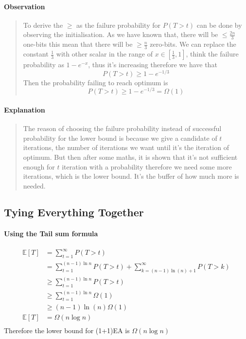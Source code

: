 \documentclass[a4paper, 12pt]{article}
\begin{document}
        \paragraph{Observation}
            \begin{quote}
                To derive the $\geq$ as the failure probability for $P(T > t)$ can be done by observing the initialisation. As we have known that,
                there will be $\leq\frac{2n}{3}$ one-bits this mean that there will be $\geq\frac{n}{3}$ zero-bits. We can replace the constant $\frac{1}{3}$ with
                other scalar in the range of $x\in\left[\frac{1}{3},1\right]$, think the failure probability as $1-e^{-x}$, thus it's increasing therefore we have
                that
                \begin{equation*}
                    P(T > t) \geq 1 - e^{-1/3} 
                \end{equation*}
                Then the probability failing to reach optimum is 
                \begin{equation*}
                    P(T > t)\geq  1 - e^{-1/3} =\Omega(1)
                \end{equation*}
            \end{quote}
        \paragraph{Explanation}
            \begin{quote}
                The reason of choosing the failure probability instead of successful probability for the lower bound is because we give a candidate of $t$
                iterations, the number of iterations we want until it's the iteration of optimum. But then after some maths, it is shown that it's not
                sufficient enough for $t$ iteration with a probability therefore we need some more iterations, which is the lower bound. It's the buffer of 
                how much more is needed.
            \end{quote}
    \subsection{Tying Everything Together}
        \paragraph{Using the Tail sum formula}
        \begin{align*}
            \mathbb{E}[T] &= \sum_{t=1}^{\infty}P(T>t)\\
            &= \sum_{t=1}^{(n-1)\ln n}P(T>t) + \sum_{k=(n-1)\ln(n) + 1}^{\infty}P(T>k)\\
            &\geq \sum_{t=1}^{(n-1)\ln n}P(T>t)\\
            &\geq \sum_{t=1}^{(n-1)\ln n}\Omega(1)\\
            &\geq (n-1)\ln(n)\Omega(1)\\
            \mathbb{E}[T]&=\Omega(n\log n)\\
        \end{align*}
        Therefore the lower bound for (1+1)EA is $\Omega(n\log n)$
\end{document}
